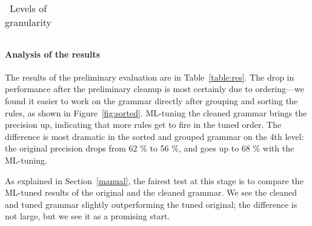{{\begin{table*}[t]
\begin{tabular}{llll}
\end{tabular}
\caption{Levels of granularity}
\label{table:levels}
\end{table*}



\paragraph{Analysis of the results}
\label{analysis}

The results of the preliminary evaluation are in Table~\ref{table:res}. 
The drop in performance after the preliminary cleanup is most certainly due to ordering---we found it 
easier to work on the grammar directly after grouping and sorting the rules, as shown in
Figure~\ref{fig:sorted}. 
ML-tuning the cleaned grammar brings the precision up, indicating that
more rules get to fire in the tuned order. The difference is most
dramatic in the sorted and grouped grammar on the 4th level: the
original precision drops from 62 \% to 56 \%, and goes up to 68 \%
with the ML-tuning. 

As explained in Section~\ref{manual}, the fairest test at this stage is to compare the
ML-tuned results of the original and the cleaned grammar.
We see the cleaned and tuned grammar slightly outperforming the tuned original;
the difference is not large, but we see it as a promising start.







}}
